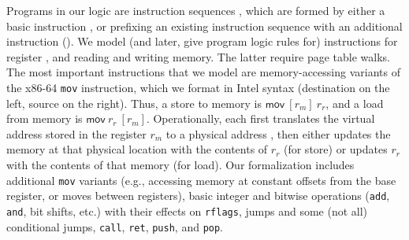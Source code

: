 
Programs in our logic are instruction sequences \instrs, which are formed by either a basic instruction \iskip, or prefixing an existing instruction
sequence with an additional instruction (\iseq\instr\instrs).
We model (and later, give program logic rules for) instructions for register , and reading and writing memory.
The latter require page table walks.
The most important instructions that we model are memory-accessing variants of the x86-64 \lstinline|mov| instruction, which we format in Intel syntax
(destination on the left, source on the right).
Thus, a store to memory is $\textsf{mov}~[r_m]~r_r$, and a load from memory is $\textsf{mov}~r_r~[r_m]$.
Operationally, each first translates the virtual address stored in the register $r_m$ to a physical address ,
then either updates the memory at that physical location with the contents of $r_r$ (for store)
or updates $r_r$ with the contents of that memory (for load).
Our formalization includes
additional \lstinline|mov| variants (e.g., accessing memory at constant offsets from the base register, or moves between registers),
basic integer and bitwise operations (\lstinline|add|,
\lstinline|and|, bit shifts, etc.) with their effects on \lstinline|rflags|, jumps and some (not all) conditional jumps, \lstinline|call|, \lstinline|ret|, \lstinline|push|,
and \lstinline|pop|.
